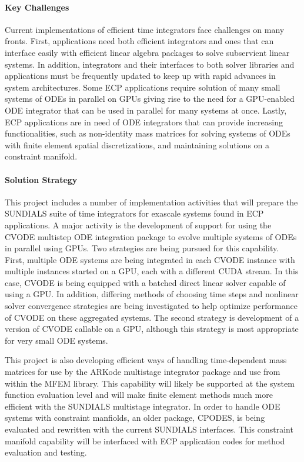 \paragraph{Key Challenges}

Current implementations of efficient time integrators face challenges on many fronts.  
First, applications need both efficient integrators and ones that can interface easily with efficient linear algebra
packages to solve subservient linear systems.  In addition, integrators and their interfaces to both solver libraries 
and applications must be frequently updated to keep up with rapid advances in system architectures. Some ECP applications require solution of many small systems of ODEs in parallel on GPUs giving rise to the need for 
a GPU-enabled ODE integrator that can be used in parallel for many systems at once. Lastly, ECP applications are in need of ODE integrators that can provide increasing functionalities, such as non-identity mass matrices for solving systems of ODEs with finite element spatial discretizations, and maintaining solutions on a constraint manifold.

\paragraph{Solution Strategy}

This project includes a number of implementation activities that will prepare the SUNDIALS suite of time integrators for exascale systems found in ECP applications.  A major activity is the development of support for using the CVODE multistep
ODE integration package to evolve multiple systems of ODEs in parallel using GPUs.  Two strategies are being pursued for this capability.  First, multiple ODE systems are being integrated in each CVODE instance with multiple instances started on a GPU, each with a different CUDA stream.  In this case, CVODE is being equipped with a batched direct linear 
solver capable of using a GPU.  In addition, differing methods of choosing time steps and nonlinear solver convergence strategies are being investigated to help optimize performance of CVODE on these aggregated systems.  The second strategy is development of a version of CVODE callable on a GPU, although this strategy is most appropriate for very small ODE systems.  

This project is also developing efficient ways of handling time-dependent mass matrices for use by the ARKode multistage integrator package and use from within the MFEM library.  This capability will likely be supported at the system function evaluation level and will make finite element methods much more efficient with the 
SUNDIALS multistage integrator.  In order to handle ODE systems with constraint manfiolds, an older package, CPODES, is being evaluated and rewritten with the current SUNDIALS interfaces.  This constraint manifold capability will be interfaced with ECP application codes for method evaluation and testing.  

